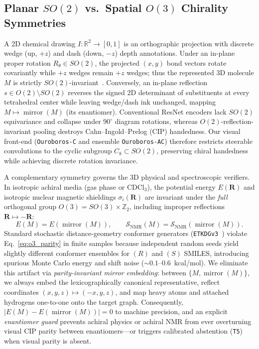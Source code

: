 \documentclass[10pt,twocolumn]{article}
\begin{document}
\subsection{Planar $SO(2)$ vs.\ Spatial $O(3)$ Chirality Symmetries}
\label{sec:symmetry}

A 2D chemical drawing $I: \mathbb{R}^2 \to [0,1]$ is an orthographic projection with discrete wedge (up, $+z$) and dash (down, $-z$) depth annotations. Under an in-plane proper rotation $R_\theta \in SO(2)$, the projected $(x,y)$ bond vectors rotate covariantly while $+z$ wedges remain $+z$ wedges; thus the represented 3D molecule $M$ is strictly $SO(2)$-invariant~\cite{Weiler2019Steerable}. Conversely, an in-plane reflection $s \in O(2)\setminus SO(2)$ reverses the signed 2D determinant of substituents at every tetrahedral center while leaving wedge/dash ink unchanged, mapping $M \mapsto \operatorname{mirror}(M)$ (its enantiomer). Conventional ResNet encoders lack $SO(2)$ equivariance and collapse under $90^\circ$ diagram rotations, whereas $O(2)$-reflection-invariant pooling destroys Cahn--Ingold--Prelog (CIP) handedness. Our visual front-end (\texttt{Ouroboros-C} and ensemble \texttt{Ouroboros-AC}) therefore restricts steerable convolutions to the cyclic subgroup $C_8 \subset SO(2)$, preserving chiral handedness while achieving discrete rotation invariance.

A complementary symmetry governs the 3D physical and spectroscopic verifiers. In isotropic achiral media (gas phase or $\text{CDCl}_3$), the potential energy $E(\mathbf{R})$ and isotropic nuclear magnetic shieldings $\sigma_i(\mathbf{R})$ are invariant under the \emph{full} orthogonal group $O(3) = SO(3) \times \mathbb{Z}_2$, including improper reflections $\mathbf{R} \mapsto -\mathbf{R}$:
\begin{equation}
  E(M) = E(\operatorname{mirror}(M)), \qquad \mathcal{S}_{\text{NMR}}(M) = \mathcal{S}_{\text{NMR}}(\operatorname{mirror}(M)).
  \label{eq:o3_parity}
\end{equation}
Standard stochastic distance-geometry conformer generators (\texttt{ETKDGv3}~\cite{Wang2020ETKDGv3}) violate Eq.~\eqref{eq:o3_parity} in finite samples because independent random seeds yield slightly different conformer ensembles for $(R)$ and $(S)$ SMILES, introducing spurious Monte Carlo energy and shift noise ($\sim 0.1$--$0.6$~kcal/mol). We eliminate this artifact via \emph{parity-invariant mirror embedding}: between $\{M, \operatorname{mirror}(M)\}$, we always embed the lexicographically canonical representative, reflect coordinates $(x,y,z) \mapsto (-x,y,z)$, and map heavy atoms and attached hydrogens one-to-one onto the target graph. Consequently, $|E(M) - E(\operatorname{mirror}(M))| = 0$ to machine precision, and an explicit \emph{enantiomer guard} prevents achiral physics or achiral NMR from ever overturning visual CIP parity between enantiomers---or triggers calibrated abstention (\texttt{T5}) when visual parity is absent.
\end{document}
